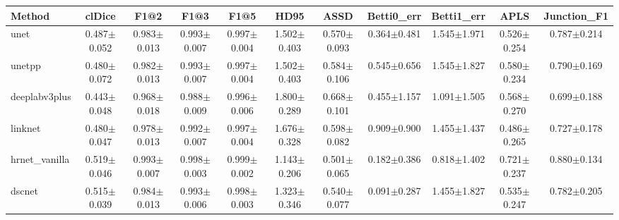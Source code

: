 \begin{tabular}{lcccccccccc}
\toprule
Method & clDice & F1@2 & F1@3 & F1@5 & HD95 & ASSD & Betti0_err & Betti1_err & APLS & Junction_F1 \\
\midrule
unet & 0.487$\pm$0.052 & 0.983$\pm$0.013 & 0.993$\pm$0.007 & 0.997$\pm$0.004 & 1.502$\pm$0.403 & 0.570$\pm$0.093 & 0.364$\pm$0.481 & 1.545$\pm$1.971 & 0.526$\pm$0.254 & 0.787$\pm$0.214 \\
unetpp & 0.480$\pm$0.072 & 0.982$\pm$0.013 & 0.993$\pm$0.007 & 0.997$\pm$0.004 & 1.502$\pm$0.403 & 0.584$\pm$0.106 & 0.545$\pm$0.656 & 1.545$\pm$1.827 & 0.580$\pm$0.234 & 0.790$\pm$0.169 \\
deeplabv3plus & 0.443$\pm$0.048 & 0.968$\pm$0.018 & 0.988$\pm$0.009 & 0.996$\pm$0.006 & 1.800$\pm$0.289 & 0.668$\pm$0.101 & 0.455$\pm$1.157 & 1.091$\pm$1.505 & 0.568$\pm$0.270 & 0.699$\pm$0.188 \\
linknet & 0.480$\pm$0.047 & 0.978$\pm$0.013 & 0.992$\pm$0.007 & 0.997$\pm$0.004 & 1.676$\pm$0.328 & 0.598$\pm$0.082 & 0.909$\pm$0.900 & 1.455$\pm$1.437 & 0.486$\pm$0.265 & 0.727$\pm$0.178 \\
hrnet_vanilla & 0.519$\pm$0.046 & 0.993$\pm$0.007 & 0.998$\pm$0.003 & 0.999$\pm$0.002 & 1.143$\pm$0.206 & 0.501$\pm$0.065 & 0.182$\pm$0.386 & 0.818$\pm$1.402 & 0.721$\pm$0.237 & 0.880$\pm$0.134 \\
dscnet & 0.515$\pm$0.039 & 0.984$\pm$0.013 & 0.993$\pm$0.006 & 0.998$\pm$0.003 & 1.323$\pm$0.346 & 0.540$\pm$0.077 & 0.091$\pm$0.287 & 1.455$\pm$1.827 & 0.535$\pm$0.247 & 0.782$\pm$0.205 \\
\bottomrule
\end{tabular}